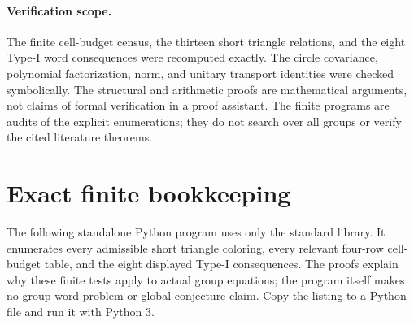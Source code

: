 \documentclass[11pt,a4paper,oneside]{report}
\theoremstyle{definition}
\theoremstyle{remark}
\begin{document}
\paragraph{Verification scope.}
The finite cell-budget census, the thirteen short triangle relations,
and the eight Type-I word consequences were recomputed exactly.
The circle covariance, polynomial factorization, norm, and unitary
transport identities were checked symbolically. The structural and
arithmetic proofs are mathematical arguments, not claims of formal
verification in a proof assistant. The finite programs are audits
of the explicit enumerations; they do not search over all groups or
verify the cited literature theorems.




\clearpage

\section{Exact finite bookkeeping}\label{M11:shared-six-code}
The following standalone Python program uses only the standard library.
It enumerates every admissible short triangle coloring, every relevant
four-row cell-budget table, and the eight displayed Type-I consequences.
The proofs explain why these finite tests apply to actual group equations;
the program itself makes no group word-problem or global conjecture claim.
Copy the listing to a Python file and run it with Python 3.
\end{document}
